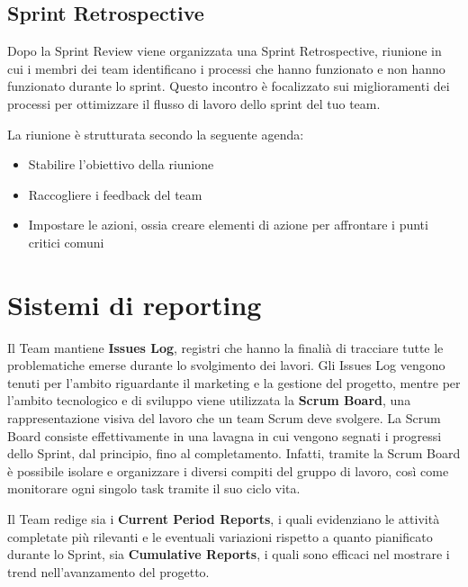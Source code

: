 \subsection*{Sprint Retrospective}

Dopo la Sprint Review viene organizzata una Sprint Retrospective, riunione in cui i membri dei team identificano i processi 
che hanno funzionato e non hanno funzionato durante lo sprint. 
Questo incontro è focalizzato sui miglioramenti dei processi per ottimizzare il flusso di lavoro dello sprint del tuo team.

La riunione è strutturata secondo la seguente agenda:
\begin{itemize}
    \item Stabilire l'obiettivo della riunione
    \item Raccogliere i feedback del team
    \item Impostare le azioni, ossia creare elementi di azione per affrontare i punti critici comuni
\end{itemize}


\section{Sistemi di reporting}

Il Team mantiene \textbf{Issues Log}, registri che hanno la finalià di tracciare tutte le problematiche emerse durante 
lo svolgimento dei lavori. Gli Issues Log vengono tenuti per l'ambito riguardante il marketing e la gestione del progetto, 
mentre per l'ambito tecnologico e di sviluppo viene utilizzata la \textbf{Scrum Board}, una rappresentazione visiva del lavoro 
che un team Scrum deve svolgere. 
La Scrum Board consiste effettivamente in una lavagna in cui vengono segnati i progressi dello Sprint, dal principio, fino al 
completamento. Infatti, tramite la Scrum Board è possibile isolare e organizzare i diversi compiti del gruppo di lavoro, così 
come monitorare ogni singolo task tramite il suo ciclo vita.


Il Team redige sia i \textbf{Current Period Reports}, i quali evidenziano le attività completate più rilevanti e le eventuali 
variazioni rispetto a quanto pianificato durante lo Sprint, sia \textbf{Cumulative Reports}, i quali sono efficaci nel mostrare
i trend nell'avanzamento del progetto.

